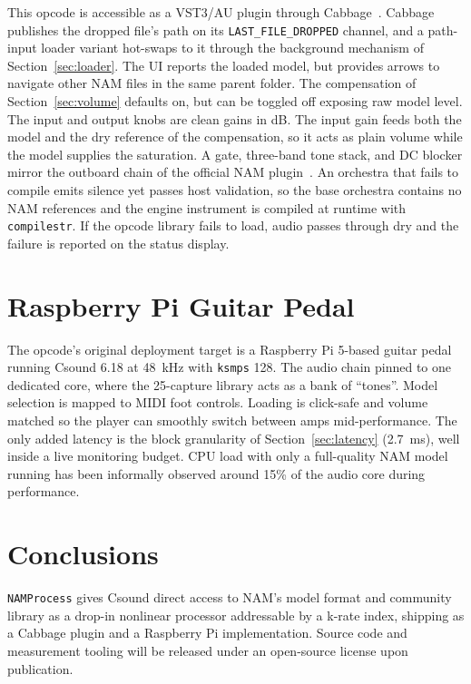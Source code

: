 \documentclass[runningheads,a4paper]{llncs}
\begin{document}
This opcode is accessible as a VST3/AU plugin through
Cabbage~\cite{walsh2011cabbage}. Cabbage publishes the
dropped file's path on its \texttt{LAST\_FILE\_DROPPED}
channel, and a path-input loader variant hot-swaps to it through the
background mechanism of Section~\ref{sec:loader}. The UI reports the loaded model, but provides arrows 
to navigate other NAM files in the same parent folder. The compensation of Section~\ref{sec:volume} defaults on, but can be toggled off exposing raw model level. The input and output knobs are clean gains in dB. The input gain feeds both the model and the dry reference of the compensation, so it acts as plain volume while the model supplies the saturation. A gate, three-band tone stack,
and DC blocker mirror the outboard chain of the official NAM plugin~\cite{namplugin}. An orchestra that fails to compile emits silence yet passes host validation, so the
base orchestra contains no NAM references and the engine instrument is
compiled at runtime with \texttt{compilestr}. If
the opcode library fails to load, audio passes through dry and the failure
is reported on the status display.

\section{Raspberry Pi Guitar Pedal}
\label{sec:pedal}

The opcode's original deployment target is a Raspberry Pi 5-based
guitar pedal running Csound 6.18 at 48~kHz with \texttt{ksmps} 128. The
audio chain pinned to one dedicated core, where the 25-capture library
acts as a bank of ``tones''. Model selection is mapped to MIDI foot
controls. Loading is
click-safe and volume matched so the player can smoothly switch between amps mid-performance. The only added latency is the block granularity
of Section~\ref{sec:latency} (2.7~ms), well inside a live monitoring
budget. CPU load with only a full-quality NAM model running has been informally
observed around 15\% of the audio core during performance.

\section{Conclusions}
\label{sec:conclusions}

\texttt{NAMProcess} gives Csound direct access to NAM's model format
and community library as a drop-in nonlinear processor addressable by a
k-rate index, shipping as a Cabbage plugin and a Raspberry Pi implementation. Source code and measurement tooling
will be released under an open-source license upon publication.
\end{document}
